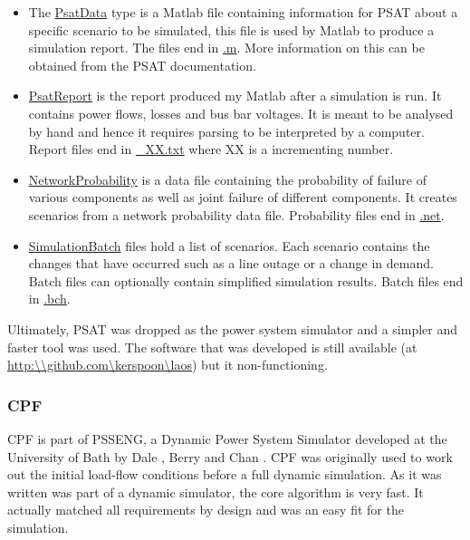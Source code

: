 \documentclass[a4paper,oneside,12pt]{report}
\begin{document}
\begin{itemize}

\item The \underline{PsatData} type is a Matlab file containing information for PSAT about a specific scenario to be simulated, this file is used by Matlab to produce a simulation report. The files end in \underline{.m}. More information on this can be obtained from the PSAT documentation.

\item \underline{PsatReport} is the report produced my Matlab after a simulation is run. It contains power flows, losses and bus bar voltages. It is meant to be analysed by hand and hence it requires parsing to be interpreted by a computer. Report files end in \underline{\_XX.txt} where XX is a incrementing number.

 \item \underline{NetworkProbability} is a data file containing the probability of failure of various components as well as joint failure of different components. It creates scenarios from a network probability data file. Probability files end in \underline{.net}.

\item \underline{SimulationBatch} files hold a list of scenarios. Each scenario contains the changes that have occurred such as a line outage or a change in demand. Batch files can optionally contain simplified simulation results. Batch files end in \underline{.bch}.
\end{itemize}

Ultimately, PSAT was dropped as the power system simulator and a simpler and faster tool was used. The software that was developed is still available (at \url{http:\\github.com\kerspoon\laos}) but it non-functioning.

\subsubsection{CPF}

CPF is part of PSSENG, a Dynamic Power System Simulator developed at the University of Bath by 
Dale \cite{Dale1986}, Berry \cite{Berry1989} and Chan \cite{Chan1992}. CPF was originally used to work out the initial load-flow conditions before a full dynamic simulation. As it was written was part of a dynamic simulator, the core algorithm is very fast. It actually matched all requirements by design and was an easy fit for the simulation. 
\end{document}
